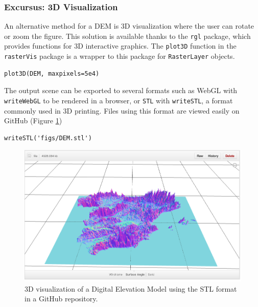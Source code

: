\subsubsection{Excursus: 3D Visualization}
\label{sec-1-1-2}
An alternative method for a DEM is 3D visualization where the user can
rotate or zoom the figure. This solution is available thanks to the
\texttt{rgl} package, which provides functions for 3D interactive
graphics. The \texttt{plot3D} function in the \texttt{rasterVis} package is a
wrapper to this package for \texttt{RasterLayer} objects.


\lstset{language=R,numbers=none}
\begin{lstlisting}
plot3D(DEM, maxpixels=5e4)
\end{lstlisting}

The output scene can be exported to several formats such as WebGL with
\texttt{writeWebGL} to be rendered in a browser, or \texttt{STL} with \texttt{writeSTL}, a
format commonly used in 3D printing. Files using this format are
viewed easily on GitHub (Figure \ref{fig:DEM_STL})

\lstset{language=R,numbers=none}
\begin{lstlisting}
writeSTL('figs/DEM.stl')
\end{lstlisting}

\begin{figure}
\includegraphics[height=0.3\textheight]{figs/DEM_STL_GitHub.png}
\caption{\label{fig:DEM_STL}3D visualization of a Digital Elevation
  Model using the STL format in a GitHub repository.}
\end{figure}

